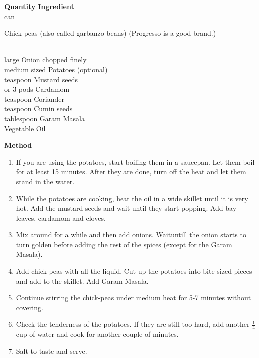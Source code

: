 \begin{tabbing}
\hspace{1.0cm}  \={\bf Quantity}   \hspace{3.0cm} \={\bf Ingredient}\\

 can   \>\parbox[t]{2in}{Chick peas (also called gar\-ban\-zo beans) (Pro\-gres\-so is a good brand.)}\\
 large   \>Onion  chopped finely\\
 medium sized   \>Potatoes (optional)\\
 teaspoon   \>Mustard seeds \\
 or 3 pods   \>Cardamom \\
 teaspoon   \>Coriander \\
 teaspoon   \>Cumin seeds \\
 tablespoon   \>Garam Masala \\
\> \>Vegetable Oil \\
\end{tabbing}

{\bf Method}
\begin{enumerate}
   \item  If  you  are  using  the potatoes, start boiling them in a saucepan.
      Let them boil for at least 15 minutes.  After they  are  done,  turn
      off the heat and let them stand in the water.
   \item While  the potatoes are cooking, heat the oil in a wide skillet until
      it is very hot.  Add the mustard seeds  and  wait  until  they  start
      popping.  Add bay leaves, cardamom and cloves.
   \item Mix  around  for a while and then add onions.  Waituntill the onion starts
      to turn golden before adding the rest of the spices (except for the
      Garam Masala).
   \item Add  chick-peas  with  all the liquid.  Cut up the potatoes into bite
      sized pieces and add to the skillet.  Add Garam Masala.
   \item Continue stirring the chick-peas under medium heat  for  5-7  minutes
      without covering.
   \item Check  the tenderness  of the potatoes.    If  they are still too hard, add
      another $\frac{1}{4}$ cup of water and cook for another couple of minutes.
   \item Salt to taste and serve.
\end{enumerate}

